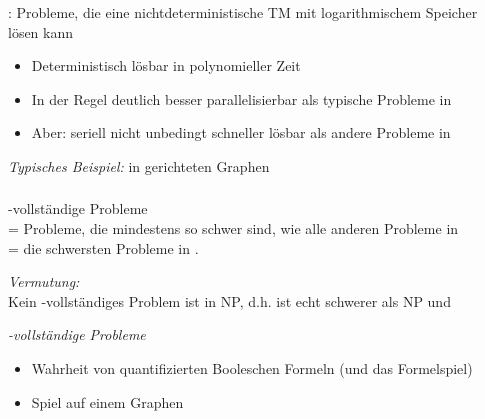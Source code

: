 \documentclass[onlymath]{beamer}
\begin{document}
\maketitle

\begin{frame}\frametitle{}

\NLogSpace: Probleme, die eine nichtdeterministische TM mit logarithmischem Speicher lösen kann


\begin{itemize}
\item Deterministisch lösbar in polynomieller Zeit
\item In der Regel deutlich besser parallelisierbar als typische Probleme in \PTime
\item Aber: seriell nicht unbedingt schneller lösbar als andere Probleme in \PTime
\end{itemize}
\bigskip

\emph{Typisches Beispiel:}
 in gerichteten Graphen


\end{frame}

\begin{frame}\frametitle{\PSpace}

\PSpace-vollständige Probleme\\ = Probleme, die mindestens so schwer
sind, wie alle anderen Probleme in \PSpace\\
= die schwersten Probleme in \PSpace.
\bigskip

\emph{Vermutung:}\\
Kein \PSpace-vollständiges Problem ist in NP, d.h. \PSpace
ist echt schwerer als NP und 
\bigskip

\emph{\PSpace-vollständige Probleme}
\begin{itemize}
\item {} Wahrheit von quantifizierten Booleschen Formeln (und das Formelspiel)
\item {} Spiel auf einem Graphen
\end{itemize}


\end{frame}

\end{document}
